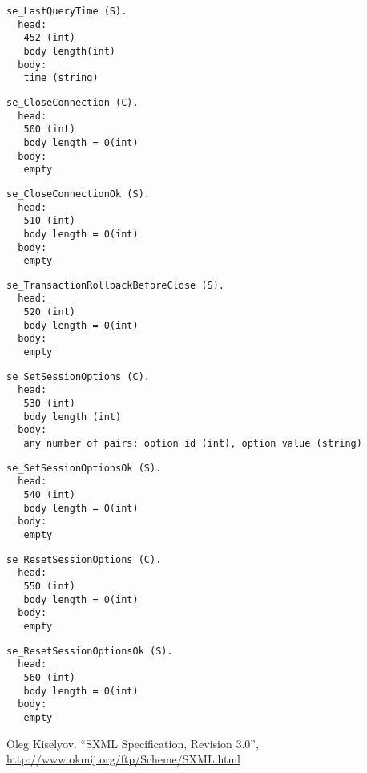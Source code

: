 \documentclass[a4paper,12pt]{article}
\begin{document}
\begin{verbatim}
se_LastQueryTime (S).
  head:
   452 (int)
   body length(int)
  body:
   time (string)
\end{verbatim}

\begin{verbatim}
se_CloseConnection (C).
  head:
   500 (int)
   body length = 0(int)
  body:
   empty
\end{verbatim}

\begin{verbatim}
se_CloseConnectionOk (S).
  head:
   510 (int)
   body length = 0(int)
  body:
   empty
\end{verbatim}

\begin{verbatim}
se_TransactionRollbackBeforeClose (S).
  head:
   520 (int)
   body length = 0(int)
  body:
   empty
\end{verbatim}

\begin{verbatim}
se_SetSessionOptions (C).
  head:
   530 (int)
   body length (int)
  body:
   any number of pairs: option id (int), option value (string)
\end{verbatim}

\begin{verbatim}
se_SetSessionOptionsOk (S).
  head:
   540 (int)
   body length = 0(int)
  body:
   empty
\end{verbatim}

\begin{verbatim}
se_ResetSessionOptions (C).
  head:
   550 (int)
   body length = 0(int)
  body:
   empty
\end{verbatim}

\begin{verbatim}
se_ResetSessionOptionsOk (S).
  head:
   560 (int)
   body length = 0(int)
  body:
   empty
\end{verbatim}

\begin{thebibliography}{1}

Oleg Kiselyov.
``SXML Specification, Revision 3.0'',
\url{http://www.okmij.org/ftp/Scheme/SXML.html}
\end{thebibliography}
\end{document}
